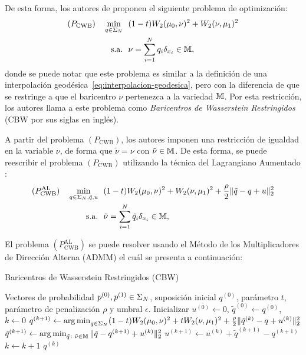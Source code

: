 De esta forma, los autores de \cite{simon2020barycenters} proponen el siguiente problema de optimización:
\begin{align*}
	(P_{\mathrm{CWB}}) \quad
	\min_{q \in \Simplex[N]} & \ \ (1-t) \Wasserstein[2]{\mu_0}{\nu}^2 + \Wasserstein[2]{\nu}{\mu_1}^2 \\
	\text{s.a.}              & \ \ \nu = \sum_{i=1}^{N} q_i \delta_{x_i} \in \bM,
\end{align*}
donde se puede notar que este problema es similar a la definición de una interpolación geodésica~\eqref{eq:interpolacion-geodesica}, pero con la diferencia de que se restringe a que el baricentro $\nu$ pertenezca a la variedad $\bM$. Por esta restricción, los autores llama a este problema como \textit{Baricentros de Wasserstein Restringidos} (CBW por sus siglas en inglés).

A partir del problema $(P_{\mathrm{CWB}})$, los autores imponen una restricción de igualdad en la variable $\nu$, de forma que $\tilde \nu = \nu$ con $\tilde \nu \in \bM$. De esta forma, se puede reescribir el problema $(P_{\mathrm{CWB}})$ utilizando la técnica del Lagrangiano Aumentado \cite[Sec. 2.3]{boyd2011distributed}:
\begin{align*}
	(P_{\mathrm{CWB}}^{\mathrm{AL}}) \quad
	\min_{q\in\Simplex[N],\tilde q,u} & \ \ (1-t) \Wasserstein[2]{\mu_0}{\nu}^2 + \Wasserstein[2]{\nu}{\mu_1}^2
	+ \frac{\rho}{2} \| \tilde q - q + u \|_2^2                                                                 \\
	\text{s.a.}                       & \ \ \tilde \nu = \sum_{i=1}^{N} \tilde q_i \delta_{x_i} \in \bM,
\end{align*}

El problema $(P_{\mathrm{CWB}}^{\mathrm{AL}})$ se puede resolver usando el Método de los Multiplicadores de Dirección Alterna (ADMM) \cite[Cap. 3]{boyd2011distributed} el cuál se presenta a continuación:

\begin{algorithm}[H]
	\caption{Baricentros de Wasserstein Restringidos (CBW)}\label{alg:ADMM-CWB}
	\begin{algorithmic}[1]
		\Require Vectores de probabilidad $p^{(0)}, p^{(1)} \in \Simplex[N]$, suposición inicial $q^{(0)}$, parámetro $t$, parámetro de penalización $\rho$ y umbral $\epsilon$.
		\State Inicializar $u^{(0)} \gets 0$, $\tilde q^{(0)} \gets q^{(0)}$, $k \gets 0$
		\Repeat
		\State $q^{(k+1)} \gets \argmin_{q\in\Simplex[N]}  (1-t) \Wasserstein[2]{\mu_0}{\nu}^2 + t\Wasserstein[2]{\nu}{\mu_1}^2 + \frac{\rho}{2} \| \tilde q^{(k)} - q + u^{(k)} \|_2^2$
		\State $\tilde q^{(k+1)} \gets \argmin_{\tilde q \colon \tilde \nu \in \bM } \| \tilde q - q^{(k+1)} + u^{(k)} \|_2^2 $
		\State $u^{(k+1)} \gets u^{(k)} + \tilde q^{(k+1)} - q^{(k+1)}$
		\State $k \gets k + 1$
		\State\Return $q^{(k)}$
	\end{algorithmic}
\end{algorithm}

